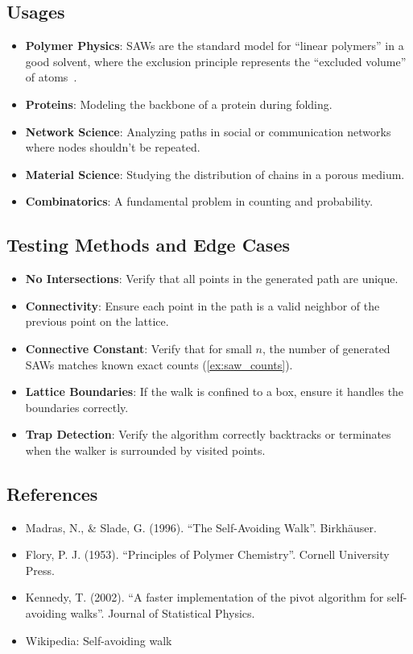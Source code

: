 \subsection{Usages}
\begin{itemize}
    \item \textbf{Polymer Physics}: SAWs are the standard model for ``linear polymers'' in a good solvent, where the exclusion principle represents the ``excluded volume'' of atoms~\cite{flory1953}.
    \item \textbf{Proteins}: Modeling the backbone of a protein during folding.
    \item \textbf{Network Science}: Analyzing paths in social or communication networks where nodes shouldn't be repeated.
    \item \textbf{Material Science}: Studying the distribution of chains in a porous medium.
    \item \textbf{Combinatorics}: A fundamental problem in counting and probability.
\end{itemize}

\subsection{Testing Methods and Edge Cases}
\begin{itemize}
    \item \textbf{No Intersections}: Verify that all points in the generated path are unique.
    \item \textbf{Connectivity}: Ensure each point in the path is a valid neighbor of the previous point on the lattice.
    \item \textbf{Connective Constant}: Verify that for small $n$, the number of generated SAWs matches known exact counts (\cref{ex:saw_counts}).
    \item \textbf{Lattice Boundaries}: If the walk is confined to a box, ensure it handles the boundaries correctly.
    \item \textbf{Trap Detection}: Verify the algorithm correctly backtracks or terminates when the walker is surrounded by visited points.
\end{itemize}

\subsection{References}
\begin{itemize}
    \item Madras, N., \& Slade, G. (1996). ``The Self-Avoiding Walk''. Birkh\"{a}user.
    \item Flory, P. J. (1953). ``Principles of Polymer Chemistry''. Cornell University Press.
    \item Kennedy, T. (2002). ``A faster implementation of the pivot algorithm for self-avoiding walks''. Journal of Statistical Physics.
    \item Wikipedia: Self-avoiding walk
\end{itemize}
